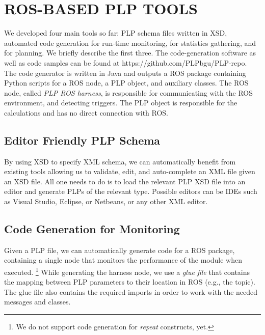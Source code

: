 \documentclass[ 5p, 12pt, times, twocolumn, sort&compress ]{elsarticle}
\newcommand\note[1]{\todo[inline, color=red!40]{#1}}
\newcommand\mNote[1]{\todo[inline, author=Michael, color=cyan]{#1}}
\newcommand\maNote[1]{\todo[inline, author=Maor, color=green]{#1}}
\newcommand\rNote[1]{\todo[inline, author=Ronen, color=yellow]{#1}}
\begin{document}
\section{ROS-BASED PLP TOOLS}
We developed four main tools so far: PLP schema files written in XSD, %
automated code generation for run-time monitoring, for statistics gathering, and for planning.
We briefly describe the first three. The code-generation software as well as code samples can be found at https://github.com/PLPbgu/PLP-repo.
The code generator is written in Java and outputs a ROS package containing Python scripts for a ROS node, a PLP object, and auxiliary classes. The ROS node, called \emph{PLP ROS harness}, is responsible for communicating with the ROS environment, and detecting triggers. The PLP object is responsible for the calculations and has no direct connection with ROS.
\subsection{Editor Friendly PLP Schema}
By using XSD to specify XML schema, we can automatically benefit from existing tools allowing us to validate, edit, and auto-complete an XML file given an XSD file. All one needs to do is to
load the relevant PLP XSD file into an editor and generate PLPs of the relevant type. Possible editors can be IDEs such as Visual Studio, Eclipse, or Netbeans, or any other XML editor.

\subsection{Code Generation for Monitoring}
Given a PLP file, we can automatically generate code for a ROS package, containing a single node that monitors the performance of the module when executed.%
\footnote{We do not support code generation for {\em repeat\/} constructs, yet.}
While generating the harness node, we use a \emph{glue file} that contains the mapping between PLP parameters to their location in ROS (e.g., the topic). The glue file also contains the required imports in order to work with the needed messages and classes.
\end{document}

